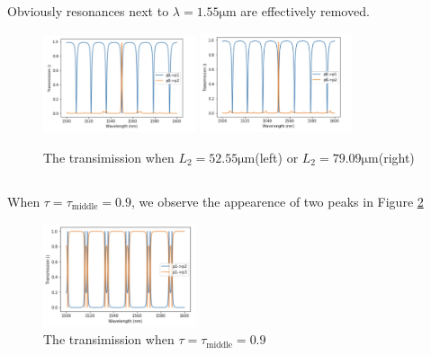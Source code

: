 \documentclass[fontsize=11pt]{scrartcl}
\begin{document}
Obviously resonances next to $\lambda=1.55\mathrm{\mu m}$ are effectively
removed.
\begin{figure}[H]
    \centering
    \includegraphics[width=0.4\textwidth]{img/fig3.1a.png}
    \hspace{0.5cm}
    \includegraphics[width=0.4\textwidth]{img/fig3.1b.png}
    \caption{The transimission when $L_2=52.55 \mathrm{\mu m}$(left) 
    or $L_2=79.09 \mathrm{\mu m}$(right)}
    \label{fig3.1}
\end{figure}

\subsection{}
When $\tau = \tau_{\mathrm{middle}}=0.9$, we observe the appearence of 
two peaks in Figure \ref{fig3.2}
\begin{figure}[H]
    \centering
    \includegraphics[width=0.4\textwidth]{img/fig3.2.png}
    \caption{The transimission when $\tau = \tau_{\mathrm{middle}}=0.9$}
    \label{fig3.2}
\end{figure}
\end{document}

